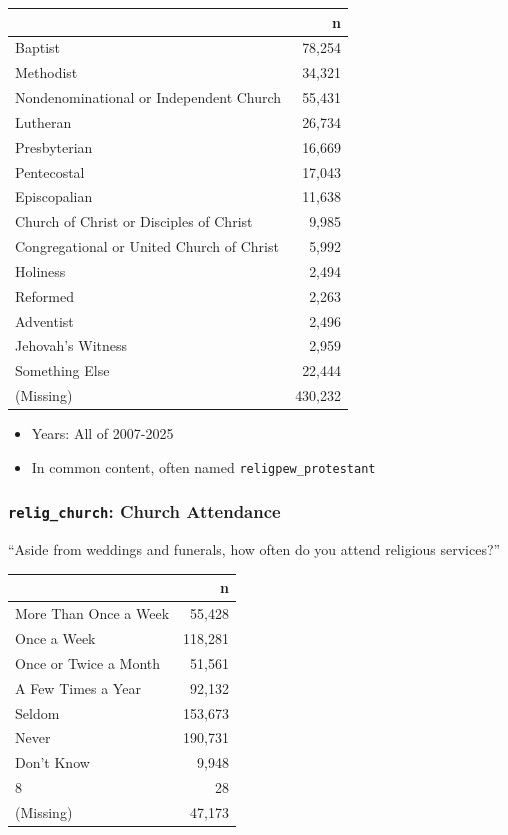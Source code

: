 \documentclass[10pt,article,oneside]{memoir}
\begin{document}
\begin{table}[H]
\centering
\begin{tabular}[t]{lr}
\toprule
 & n\\
\midrule
Baptist & 78,254\\
Methodist & 34,321\\
Nondenominational or Independent Church & 55,431\\
Lutheran & 26,734\\
Presbyterian & 16,669\\
Pentecostal & 17,043\\
Episcopalian & 11,638\\
Church of Christ or Disciples of Christ & 9,985\\
Congregational or United Church of Christ & 5,992\\
Holiness & 2,494\\
Reformed & 2,263\\
Adventist & 2,496\\
Jehovah's Witness & 2,959\\
Something Else & 22,444\\
(Missing) & 430,232\\
\bottomrule
\end{tabular}
\end{table}

\begin{itemize}
\tightlist
\item
  Years: All of 2007-2025
\item
  In common content, often named \texttt{religpew\_protestant}
\end{itemize}

\subsubsection{\texorpdfstring{\texttt{relig\_church}: Church
Attendance}{relig\_church: Church Attendance}}\label{relig_church-church-attendance}

``Aside from weddings and funerals, how often do you attend religious
services?''

\begin{table}[H]
\centering
\begin{tabular}[t]{lr}
\toprule
 & n\\
\midrule
More Than Once a Week & 55,428\\
Once a Week & 118,281\\
Once or Twice a Month & 51,561\\
A Few Times a Year & 92,132\\
Seldom & 153,673\\
Never & 190,731\\
Don't Know & 9,948\\
8 & 28\\
(Missing) & 47,173\\
\bottomrule
\end{tabular}
\end{table}
\end{document}
